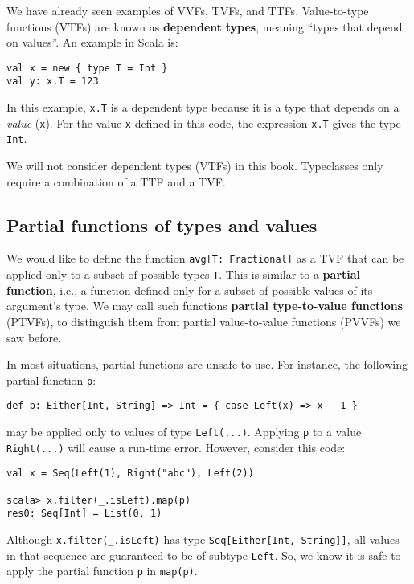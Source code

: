 We have already seen examples of VVFs, TVFs, and TTFs. Value-to-type
functions (VTFs) are known as \textbf{dependent} \textbf{types},
meaning \textsf{``}types that depend on values\textsf{''}. An example in Scala is:
\begin{lstlisting}
val x = new { type T = Int }
val y: x.T = 123
\end{lstlisting}
In this example, \lstinline!x.T! is a dependent type because it is
a type that depends on a \emph{value} (\lstinline!x!). For the value
\lstinline!x! defined in this code, the expression \lstinline!x.T!
gives the type \lstinline!Int!. 

We will not consider dependent types (VTFs) in this book. Typeclasses
only require a combination of a TTF and a TVF.

\subsection{Partial functions of types and values}

We would like to define the function \lstinline!avg[T: Fractional]!
as a TVF that can be applied only to a subset of possible types \lstinline!T!.
This is similar to a \textbf{partial function},
i.e., a function defined only for a subset of possible values of its
argument\textsf{'}s type. We may call such functions \textbf{partial type-to-value
functions} (PTVFs), to distinguish
them from partial value-to-value functions (PVVFs) we saw before.

In most situations, partial functions are unsafe to use. For instance,
the following partial function \lstinline!p!: 
\begin{lstlisting}
def p: Either[Int, String] => Int = { case Left(x) => x - 1 }
\end{lstlisting}
may be applied only to values of type \lstinline!Left(...)!. Applying
\lstinline!p! to a value \lstinline!Right(...)! will cause a run-time
error. However, consider this code:
\begin{lstlisting}
val x = Seq(Left(1), Right("abc"), Left(2))

scala> x.filter(_.isLeft).map(p)
res0: Seq[Int] = List(0, 1)
\end{lstlisting}
Although \lstinline!x.filter(_.isLeft)! has type \lstinline!Seq[Either[Int, String]]!,
all values in that sequence are guaranteed to be of subtype \lstinline!Left!.
So, we know it is safe to apply the partial function \lstinline!p!
in \lstinline!map(p)!. 

